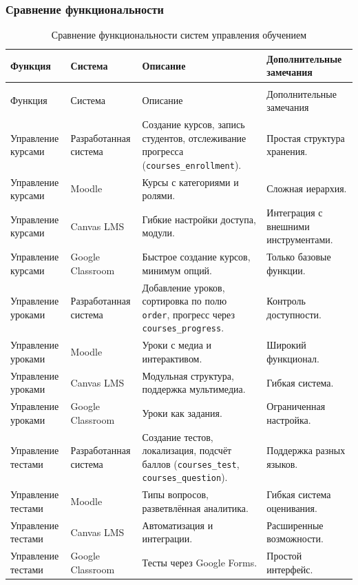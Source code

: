 \subsubsection{Сравнение функциональности}

\begin{xltabular}{\textwidth}{|p{3.1cm}|p{3.1cm}|p{3.5cm}|X|}
	\caption{Сравнение функциональности систем управления обучением\label{comparison:table}}\\ \hline
	Функция & Система & Описание & Дополнительные замечания \\ \hline
	\endfirsthead
	\\ \hline
	Функция & Система & Описание & Дополнительные замечания \\ \hline
	\endhead
	Управление курсами & Разработанная система & Создание курсов, запись студентов, отслеживание прогресса (\texttt{courses\_enroll\-ment}). & Простая структура хранения. \\ \hline
	Управление курсами & Moodle & Курсы с категориями и ролями. & Сложная иерархия. \\ \hline
	Управление курсами & Canvas LMS & Гибкие настройки доступа, модули. & Интеграция с внешними инструментами. \\ \hline
	Управление курсами & Google Classroom & Быстрое создание курсов, минимум опций. & Только базовые функции. \\ \hline
	
	Управление уроками & Разработанная система & Добавление уроков, сортировка по полю \texttt{order}, прогресс через \texttt{courses\_progress}. & Контроль доступности. \\ \hline
	Управление уроками & Moodle & Уроки с медиа и интерактивом. & Широкий функционал. \\ \hline
	Управление уроками & Canvas LMS & Модульная структура, поддержка мультимедиа. & Гибкая система. \\ \hline
	Управление уроками & Google Classroom & Уроки как задания. & Ограниченная настройка. \\ \hline
	
	Управление тестами & Разработанная система & Создание тестов, локализация, подсчёт баллов (\texttt{courses\_test}, \texttt{courses\_question}). & Поддержка разных языков. \\ \hline
	Управление тестами & Moodle & Типы вопросов, разветвлённая аналитика. & Гибкая система оценивания. \\ \hline
	Управление тестами & Canvas LMS & Автоматизация и интеграции. & Расширенные возможности. \\ \hline
	Управление тестами & Google Classroom & Тесты через Google Forms. & Простой интерфейс. \\ \hline
	

\end{xltabular}
